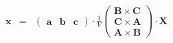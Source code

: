 \documentclass[12pt]{article}
\begin{document}
\begin{eqnarray*}
\mathbf{x}
 &=& 
\begin{pmatrix}
\mathbf{a}  &
\mathbf{b}  &
\mathbf{c} 
\end{pmatrix}
\cdot 
 \frac{1}{V}
 \begin{pmatrix}
\mathbf{B \times C}  \\
\mathbf{C \times A}  \\
\mathbf{A \times B} 
\end{pmatrix}
\cdot 
\mathbf{X}
\end{eqnarray*}
\end{document}
